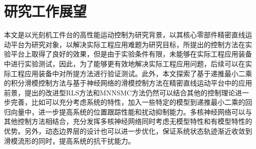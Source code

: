 \section{研究工作展望}
本文是以光刻机工件台的高性能运动控制为研究背景，以其核心零部件精密直线运动平台为研究对象，以解决实际工程应用难题为研究目标，所提出的控制方法在实验平台上取得了良好的效果，但是由于实验条件有限，未能够在实际工程应用装备中进行实验测试，因此，为了能够更有效地解决实际工程应用问题，后续可以在实际工程应用装备中对所提方法进行验证测试。此外，本文探索了基于递推最小二乘的积分滑模控制方法与基于神经网络的滑模控制方法在精密直线运动平台中的应用前景，提出的改进型RLS方法和MNNSMC方法仍然可以结合其他的控制理论进一步完善，比如可以充分考虑系统的特性，加入一些特定的模型到递推最小二乘的回归向量中，进一步提高系统的位置跟踪性能和扰动抑制能力。多核神经网络可以与其他控制方法相结合，充分发挥多核神经网络同时考虑无模型特性和有模型特性的优势。另外，动态边界层的设计也可以进一步优化，保证系统状态轨迹渐近收敛到滑模流形的同时，提高系统的抗干扰能力。
